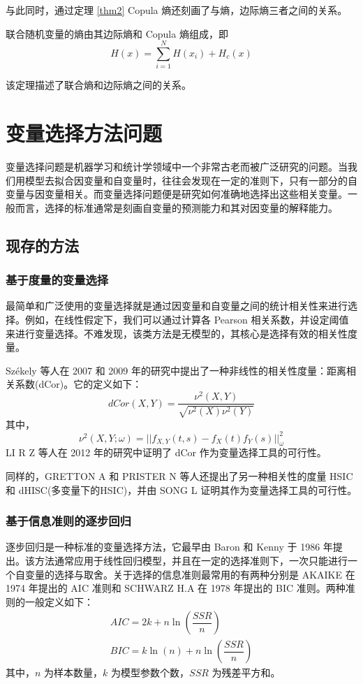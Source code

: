 \documentclass[a4paper]{ctexart}
\begin{document}
与此同时，通过定理 \ref{thm2} Copula 熵还刻画了与熵，边际熵三者之间的关系。
\begin{theorem}
	\label{thm2}
	联合随机变量的熵由其边际熵和 Copula 熵组成，即
	\begin{equation}
		H(x) = \sum\limits_{i=1}^N H(x_i) + H_c(x) 
	\end{equation}
\end{theorem}

该定理描述了联合熵和边际熵之间的关系。


\section{变量选择方法问题}
变量选择问题是机器学习和统计学领域中一个非常古老而被广泛研究的问题。当我们用模型去拟合因变量和自变量时，往往会发现在一定的准则下，只有一部分的自变量与因变量相关。而变量选择问题便是研究如何准确地选择出这些相关变量。一般而言，选择的标准通常是刻画自变量的预测能力和其对因变量的解释能力。
\subsection{现存的方法}
\subsubsection{基于度量的变量选择}
最简单和广泛使用的变量选择就是通过因变量和自变量之间的统计相关性来进行选择。例如，在线性假定下，我们可以通过计算各 Pearson 相关系数，并设定阈值来进行变量选择。不难发现，该类方法是无模型的，其核心是选择有效的相关性度量。

Sz\'ekely\cite{ref7,ref8} 等人在 2007 和 2009 年的研究中提出了一种非线性的相关性度量：距离相关系数(dCor)。它的定义如下：
$$
dCor(X,Y)=\dfrac{\nu^2(X,Y)}{\sqrt{\nu^2(X)\nu^2(Y)}}
$$
其中，
$$
\nu^2(X,Y;\omega)=||f_{X,Y}(t,s)-f_X(t)f_Y(s)||^2_\omega
$$
LI R Z\cite{ref9} 等人在 2012 年的研究中证明了 dCor 作为变量选择工具的可行性。

同样的，GRETTON A\cite{ref10} 和 PRISTER N\cite{ref11} 等人还提出了另一种相关性的度量 HSIC 和 dHISC(多变量下的HSIC)，并由 SONG L\cite{ref12} 证明其作为变量选择工具的可行性。
\subsubsection*{基于信息准则的逐步回归}
逐步回归是一种标准的变量选择方法，它最早由 Baron 和 Kenny\cite{ref13} 于 1986 年提出。该方法通常应用于线性回归模型，并且在一定的选择准则下，一次只能进行一个自变量的选择与取舍。关于选择的信息准则最常用的有两种分别是 AKAIKE\cite{ref14} 在 1974 年提出的 AIC 准则和 SCHWARZ H.A\cite{ref15} 在 1978 年提出的 BIC 准则。两种准则的一般定义如下：
\begin{equation}
\label{eq3}
\begin{array}{l}
	AIC = 2k+n\ln(\dfrac{SSR}{n})\\
	BIC = k\ln(n)+n\ln(\dfrac{SSR}{n})
\end{array}
\end{equation}
其中，$n$ 为样本数量，$k$ 为模型参数个数，$SSR$ 为残差平方和。
\end{document}
